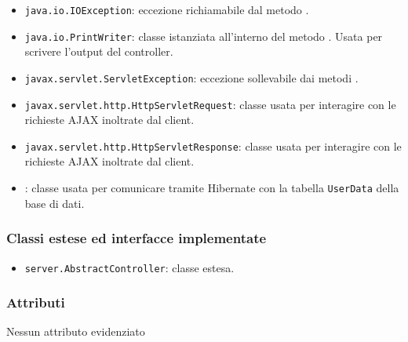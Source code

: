 \begin{itemize}
	\item \texttt{java.io.IOException}: eccezione richiamabile dal metodo .
	\item \texttt{java.io.PrintWriter}: classe istanziata all'interno del metodo . Usata per scrivere l'output del controller.
	\item \texttt{javax.servlet.ServletException}: eccezione sollevabile dai metodi .
	\item \texttt{javax.servlet.http.HttpServletRequest}: classe usata per interagire con le richieste AJAX inoltrate dal client.
	\item \texttt{javax.servlet.http.HttpServletResponse}: classe usata per interagire con le richieste AJAX inoltrate dal client.
	\item {}: classe usata per comunicare tramite Hibernate con la tabella \texttt{UserData} della base di dati.
\end{itemize}

\subsubsection*{Classi estese ed interfacce implementate}
\begin{itemize}
	\item \texttt{server.AbstractController}: classe estesa.
\end{itemize}

\subsubsection*{Attributi}

Nessun attributo evidenziato

